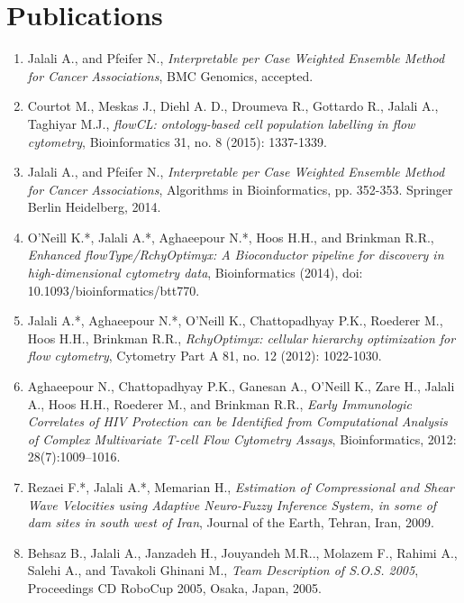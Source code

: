 \documentclass[11pt,a4paper,sans]{moderncv} %
\begin{document}

\section{Publications}

\begin{enumerate}
\item Jalali A., and Pfeifer N., \emph{Interpretable per Case Weighted Ensemble Method for Cancer Associations}, BMC Genomics, accepted.

\item Courtot M., Meskas J., Diehl A. D., Droumeva R., Gottardo R., Jalali A., Taghiyar M.J., \emph{flowCL: ontology-based cell population labelling in flow cytometry}, Bioinformatics 31, no. 8 (2015): 1337-1339.

\item Jalali A., and Pfeifer N., \emph{Interpretable per Case Weighted Ensemble Method for Cancer Associations}, Algorithms in Bioinformatics, pp. 352-353. Springer Berlin Heidelberg, 2014.

\item O'Neill K.*, Jalali A.*, Aghaeepour N.*, Hoos H.H., and Brinkman R.R., \emph{Enhanced flowType/RchyOptimyx: A Bioconductor pipeline for discovery in high-dimensional cytometry data}, Bioinformatics (2014), doi: 10.1093/bioinformatics/btt770.

\item Jalali A.*, Aghaeepour N.*, O'Neill K., Chattopadhyay P.K., Roederer M., Hoos H.H., Brinkman R.R., \emph{RchyOptimyx: cellular hierarchy optimization for flow cytometry}, Cytometry Part A 81, no. 12 (2012): 1022-1030.

\item Aghaeepour N., Chattopadhyay P.K., Ganesan A., O'Neill K., Zare H., Jalali A., Hoos H.H., Roederer M., and Brinkman R.R., \emph{Early Immunologic Correlates of HIV Protection can be Identiﬁed from Computational Analysis of Complex Multivariate T-cell Flow Cytometry Assays},
Bioinformatics, 2012: 28(7):1009–1016.

\item Rezaei F.*, Jalali A.*, Memarian H., \emph{Estimation of Compressional and Shear Wave Velocities using Adaptive Neuro-Fuzzy Inference System, in some of dam sites in south west of Iran}, Journal of the Earth, Tehran, Iran, 2009.

\item Behsaz B., Jalali A., Janzadeh H., Jouyandeh M.R.., Molazem F., Rahimi A., Salehi A., and Tavakoli Ghinani M., \emph{Team Description of S.O.S. 2005}, Proceedings CD RoboCup 2005, Osaka, Japan, 2005.
  

\end{enumerate}
\end{document}

